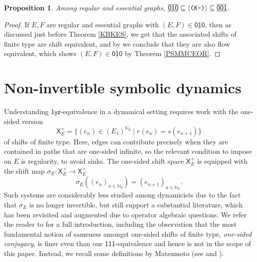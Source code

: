 \documentclass[12pt]{amsbook}%
\newcommand{\XXp}[1]{\mathsf X^+_{#1}}
\newtheorem{propo}[theor]{Proposition}
\theoremstyle{defin}
\theoremstyle{remark}
\numberwithin{equation}{chapter}
\numberwithin{theor}{section}
\newcommand{\NN}{\mathbb{N}}
\newcommand{\xyz}[1]{\mbox{$\mathsf{#1}$}}
\newcommand{\xyzrel}[1]{\mbox{$\overline{\underline{\mathsf{ #1}}}$}}
\newcommand{\KKKm}{\mbox{\texttt{\textup{(K-)}}}}
\begin{document}
\begin{propo}\label{pre-mike}
Among regular and essential graphs, $\xyzrel{010}\subseteq\langle\KKKm\rangle\subseteq \xyzrel{001}$.
\end{propo}
\begin{proof}
If $E,F$ are regular and  essential graphs with $(E,F)\in\xyzrel{010}$, then as discussed just before Theorem \ref{KBKES}, we get that the associated shifts of finite type are shift equivalent, and by \cite{mb:seifesft} we conclude that they are also flow equivalent, which shows $(E,F)\in\xyzrel{010}$ by Theorem \ref{PSMMCEOR}.
\end{proof}



\section{Non-invertible symbolic dynamics}\label{onesided}
 
 

 Understanding  \xyz{1yz}-equivalence in a dynamical setting requires work 
 with the one-sided version
  \[
 \XXp E=\{(e_n)\in(E_1)^{\NN_0}\mid r(e_n)=s(e_{n+1})\}
 \]
of shifts of finite type.  Here, edges can contribute precisely when they are contained in paths that are one-sided infinite, so the relevant condition to impose on $E$ is regularity, to avoid sinks.   The one-sided shift space $\XXp E$ is equipped with the shift map $\sigma_E \colon \XXp E \to \XXp E$
$$
\sigma_E (( e_n)_{n \in \NN_0 } ) = ( e_{n+1} )_{n\in \NN_0}.
$$
Such systems are  considerably less studied among dynamicists due to the fact that $\sigma_E$ is no longer invertible, but still support a substantial literature, which has been revisited and augmented due to operator algebraic questions.
We refer the reader to \cite{kab:insdc} for a full introduction, including the observation that the most fundamental notion of sameness amongst one-sided shifts of finite type, \emph{one-sided conjugacy}, is finer even than our \xyz{111}-equivalence and hence is not in the scope of this paper. Instead, we recall some definitions by Matsumoto (see \cite{km:oetmscka} and \cite{km:coefemscacka}).%
\end{document}
